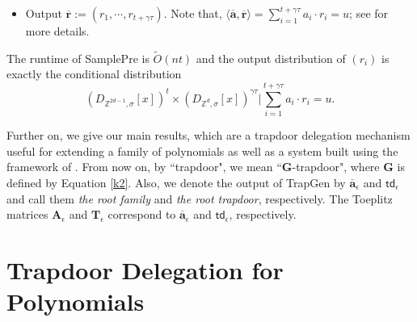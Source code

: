 \documentclass[runningheads]{llncs}
\begin{document}
\begin{description}
\begin{itemize}
\iffalse 

$$\textbf{r}=\begin{bmatrix}
\mathsf{Tp}^{2d-1,1}(r_{1})\\
 \vdots\\
 \mathsf{Tp}^{2d-1,1}(r_{t})\\
 \mathsf{Tp}^{d,1}(r_{t+1})\\
 \vdots\\
\mathsf{Tp}^{d,1}(r_{t+\gamma\tau})
\end{bmatrix}, $$

\fi 
  \item Output $\overline{\mathbf{r}}:=(r_1,\cdots,r_{t+\gamma\tau})$. Note that, $\langle \overline{\mathbf{a}}, \overline{\mathbf{r}} \rangle=\sum_{i=1}^{t+\gamma  \tau} a_i\cdot r_i=u$; see \cite[Section 5]{LVV19} for more details.
\end{itemize}


The runtime of \textsf{SamplePre} is $\tilde{O}(nt)$ and the output distribution of $(r_i)$ is exactly the conditional distribution 
$$(D_{\mathbb{Z}^{2d-1}, \sigma}[x])^t \times (D_{\mathbb{Z}^{d}, \sigma}[x])^{\gamma\tau}|\sum_{i=1}^{t+\gamma  \tau} a_i \cdot r_i=u. $$
\end{description}

Further on, we give our main results, which are a trapdoor delegation mechanism useful 
for extending a family of polynomials as well as a  system 
built using the framework of \cite{AB09}. 
From now on, by ``trapdoor", we mean ``\textbf{G}-trapdoor", 
where $\textbf{G}$ is defined by Equation \eqref{k2}. 
Also, we denote  the output of \textsf{TrapGen} by $\overline{\mathbf{a}}_{\epsilon}$ and $\mathsf{td}_{\epsilon}$ and call them \textit{the root family} and \textit{the root trapdoor}, respectively. 
The  Toeplitz matrices $\textbf{A}_{\epsilon}$ and $\textbf{T}_{\epsilon}$
correspond to $\overline{\mathbf{a}}_{\epsilon}$ and $\mathsf{td}_{\epsilon}$,
respectively.

\section{Trapdoor Delegation for Polynomials } \label{trap}
\end{document}
